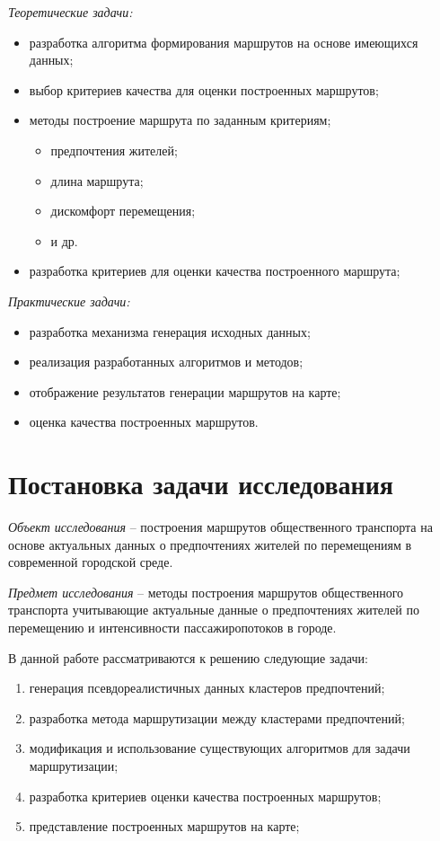 \emph{Теоретические задачи:}
\vspace*{-1em}
\begin{itemize}\itemsep-5pt
    \item разработка алгоритма формирования маршрутов на основе имеющихся данных;
    \item выбор критериев качества для оценки построенных маршрутов;
    \item методы построение маршрута по заданным критериям;
    \begin{itemize}\itemsep-5pt
        \item предпочтения жителей;
        \item длина маршрута;
        \item дискомфорт перемещения;
        \item и др.
    \end{itemize}
    \item разработка критериев для оценки качества построенного маршрута;
\end{itemize}
\emph{Практические задачи:}
\vspace*{-1em}
\begin{itemize}\itemsep-5pt
    \item разработка механизма генерация исходных данных;
    \item реализация разработанных алгоритмов и методов;
    \item отображение результатов генерации маршрутов на карте;
    \item оценка качества построенных маршрутов.
\end{itemize}

\chapter{Постановка задачи исследования}

\emph{Объект исследования} -- построения маршрутов общественного транспорта на основе актуальных 
данных о предпочтениях жителей по перемещениям в современной городской среде.

\emph{Предмет исследования} -- методы построения маршрутов общественного транспорта учитывающие 
актуальные данные о предпочтениях жителей по перемещению и интенсивности пассажиропотоков в городе.

В данной работе рассматриваются к решению следующие задачи:
\begin{enumerate}\itemsep-5pt
    \item генерация псевдореалистичных данных кластеров предпочтений;
    \item разработка метода маршрутизации между кластерами предпочтений;
    \item модификация и использование существующих алгоритмов для задачи маршрутизации;
    \item разработка критериев оценки качества построенных маршрутов;
    \item представление построенных маршрутов на карте;
\end{enumerate}

